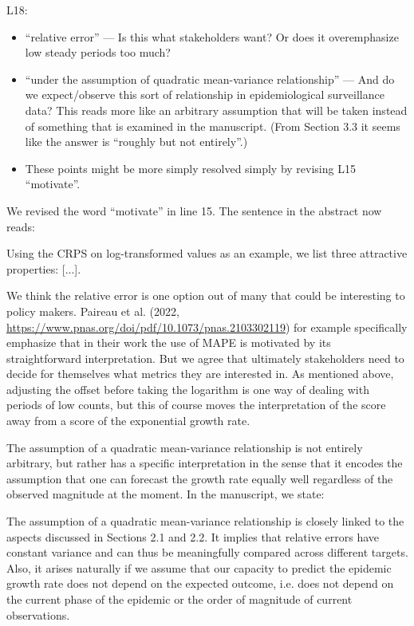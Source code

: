 \documentclass{article}
\newcommand{\black}{\color{black}}
\newcommand{\blue}{\color{blue}}
\newcommand{\indented}{\setlength{\leftskip}{1cm}}
\newcommand{\notindented}{\setlength{\leftskip}{0cm}}
\begin{document}
\notindented

\blue
L18:
\begin{itemize}
    \item ``relative error'' --- Is this what stakeholders want? Or does it overemphasize low steady periods too much?
    \item ``under the assumption of quadratic mean-variance relationship'' --- And do we expect/observe this sort of relationship in epidemiological surveillance data? This reads more like an arbitrary assumption that will be taken instead of something that is examined in the manuscript. (From Section 3.3 it seems like the answer is ``roughly but not entirely''.)
    \item These points might be more simply resolved simply by revising L15 ``motivate''.
\end{itemize}
\black 

We revised the word ``motivate'' in line 15. The sentence in the abstract now reads: 

\indented

Using the CRPS on log-transformed values as an example, we list three attractive properties: [...].

\notindented

We think the relative error is one option out of many that could be interesting to policy makers. 
Paireau et al. (2022, \url{https://www.pnas.org/doi/pdf/10.1073/pnas.2103302119}) for example specifically emphasize that in their work the use of MAPE is motivated by its
straightforward interpretation. But we agree that ultimately stakeholders need to decide for themselves what metrics they are interested in. As mentioned above, adjusting the offset before taking the logarithm is one way of dealing with periods of low counts, but this of course moves the interpretation of the score away from a score of the exponential growth rate. 

The assumption of a quadratic mean-variance relationship is not entirely arbitrary, but rather has a specific interpretation in the sense that it encodes the assumption that one can forecast the growth rate equally well regardless of the observed magnitude at the moment. In the manuscript, we state: 

\indented
The assumption of a quadratic mean-variance relationship is closely linked to the aspects discussed in Sections 2.1 and 2.2. It implies that relative errors have constant variance and can thus be meaningfully compared across different targets. Also, it arises naturally if we assume that our capacity to predict the epidemic growth rate does not depend on the expected outcome, i.e. does not depend on the current phase of the epidemic or the order of magnitude of current observations.
\end{document}
